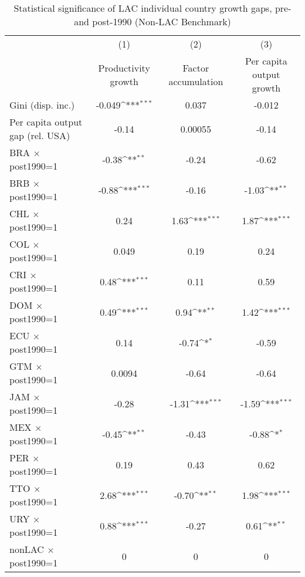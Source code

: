 \begin{sidewaystable}[htbp]\centering
\def\sym#1{\ifmmode^{#1}\else\(^{#1}\)\fi}
\caption{Statistical significance of LAC individual country growth gaps, pre- and post-1990 (Non-LAC Benchmark)}
\begin{tabular}{l*{3}{c}}
\toprule
                &\multicolumn{1}{c}{(1)}&\multicolumn{1}{c}{(2)}&\multicolumn{1}{c}{(3)}\\
                &\multicolumn{1}{c}{Productivity growth}&\multicolumn{1}{c}{Factor accumulation}&\multicolumn{1}{c}{Per capita output growth}\\
\midrule
Gini (disp. inc.)&   -0.049\sym{***}&    0.037         &   -0.012         \\
Per capita output gap (rel. USA)&    -0.14         &  0.00055         &    -0.14         \\
BRA $\times$ post1990=1&    -0.38\sym{**} &    -0.24         &    -0.62         \\
BRB $\times$ post1990=1&    -0.88\sym{***}&    -0.16         &    -1.03\sym{**} \\
CHL $\times$ post1990=1&     0.24         &     1.63\sym{***}&     1.87\sym{***}\\
COL $\times$ post1990=1&    0.049         &     0.19         &     0.24         \\
CRI $\times$ post1990=1&     0.48\sym{***}&     0.11         &     0.59         \\
DOM $\times$ post1990=1&     0.49\sym{***}&     0.94\sym{**} &     1.42\sym{***}\\
ECU $\times$ post1990=1&     0.14         &    -0.74\sym{*}  &    -0.59         \\
GTM $\times$ post1990=1&   0.0094         &    -0.64         &    -0.64         \\
JAM $\times$ post1990=1&    -0.28         &    -1.31\sym{***}&    -1.59\sym{***}\\
MEX $\times$ post1990=1&    -0.45\sym{**} &    -0.43         &    -0.88\sym{*}  \\
PER $\times$ post1990=1&     0.19         &     0.43         &     0.62         \\
TTO $\times$ post1990=1&     2.68\sym{***}&    -0.70\sym{**} &     1.98\sym{***}\\
URY $\times$ post1990=1&     0.88\sym{***}&    -0.27         &     0.61\sym{**} \\
nonLAC $\times$ post1990=1&        0         &        0         &        0         \\

\end{tabular}
\end{sidewaystable}

